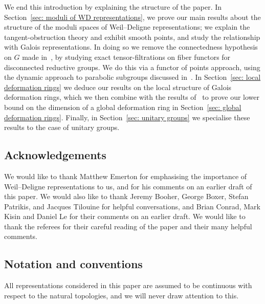 \documentclass{amsart}
\theoremstyle{definition}
\theoremstyle{remark}
\newcommand{\mar}[1]{}
\newcommand{\mar}[1]{\marginpar{\raggedright\tiny squirrel #1}}
\begin{document}
We end this introduction by explaining the structure of the paper. In
Section~\ref{sec: moduli of WD representations}, we prove our main
results about the structure of the moduli spaces of Weil--Deligne
representations; we explain the tangent-obstruction theory and exhibit
smooth points, and study the relationship with Galois
representations. In doing so we remove the connectedness hypothesis on
$G$ made in~\cite{2014arXiv1403.1411B}, by studying exact
tensor-filtrations on fiber functors for disconnected reductive
groups.  We do this via a functor of points approach, using the
dynamic approach to parabolic subgroups discussed
in~\cite[\textsection I.2.1]{predbook}. In Section~\ref{sec: local
  deformation rings} we deduce our results on the local structure of
Galois deformation rings, which we then combine with the results of~\cite{MR3152673} to
prove our lower bound on the dimension of a global deformation
ring in Section~\ref{sec:
  global deformation rings}. Finally, in Section~\ref{sec: unitary groups} we specialise
these results to the case of unitary groups.%
\subsection{Acknowledgements}We would like to thank Matthew Emerton
for emphasising the importance of Weil--Deligne representations to
us, and for his comments on an earlier draft of this paper. We would
also like to thank Jeremy Booher, George Boxer, Stefan Patrikis, and Jacques
Tilouine for helpful conversations, and Brian Conrad,  Mark Kisin and
Daniel Le
for their comments on an earlier draft. We would like to thank the
referees for their careful reading of the paper and their many helpful
comments. 

\subsection{Notation and conventions}\label{subsec:
  notation}%
All representations considered in this paper are assumed to be
continuous with respect to the natural topologies, and we will never
draw attention to this.
\end{document}
